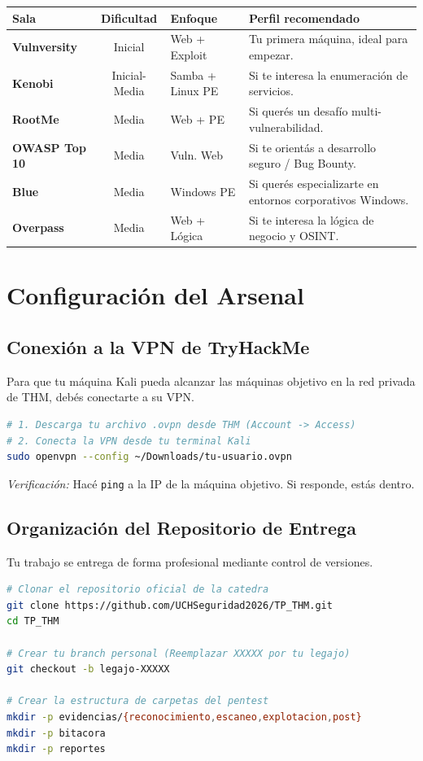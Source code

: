 \documentclass[11pt,a4paper]{article}
\begin{document}
\begin{center}
\renewcommand{\arraystretch}{1.3}
\begin{tabularx}{\textwidth}{@{} p{3.5cm} c p{2cm} X @{}}
\toprule
\textbf{Sala} & \textbf{Dificultad} & \textbf{Enfoque} & \textbf{Perfil recomendado} \\
\midrule
\textbf{Vulnversity} & Inicial & Web + Exploit & Tu primera máquina, ideal para empezar. \\
\textbf{Kenobi} & Inicial-Media & Samba + Linux PE & Si te interesa la enumeración de servicios. \\
\textbf{RootMe} & Media & Web + PE & Si querés un desafío multi-vulnerabilidad. \\
\textbf{OWASP Top 10} & Media & Vuln. Web & Si te orientás a desarrollo seguro / Bug Bounty. \\
\textbf{Blue} & Media & Windows PE & Si querés especializarte en entornos corporativos Windows. \\
\textbf{Overpass} & Media & Web + Lógica & Si te interesa la lógica de negocio y OSINT. \\
\bottomrule
\end{tabularx}
\end{center}

\section{Configuración del Arsenal}

\subsection{Conexión a la VPN de TryHackMe}
Para que tu máquina Kali pueda alcanzar las máquinas objetivo en la red privada de THM, debés conectarte a su VPN.
\begin{lstlisting}[language=bash]
# 1. Descarga tu archivo .ovpn desde THM (Account -> Access)
# 2. Conecta la VPN desde tu terminal Kali
sudo openvpn --config ~/Downloads/tu-usuario.ovpn
\end{lstlisting}
\textit{Verificación:} Hacé \texttt{ping} a la IP de la máquina objetivo. Si responde, estás dentro.

\subsection{Organización del Repositorio de Entrega}
Tu trabajo se entrega de forma profesional mediante control de versiones.
\begin{lstlisting}[language=bash]
# Clonar el repositorio oficial de la catedra
git clone https://github.com/UCHSeguridad2026/TP_THM.git
cd TP_THM

# Crear tu branch personal (Reemplazar XXXXX por tu legajo)
git checkout -b legajo-XXXXX

# Crear la estructura de carpetas del pentest
mkdir -p evidencias/{reconocimiento,escaneo,explotacion,post}
mkdir -p bitacora
mkdir -p reportes
\end{lstlisting}
\end{document}
